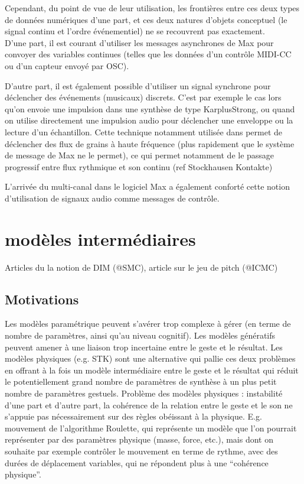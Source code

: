 Cependant, du point de vue de leur utilisation, les frontières entre ces deux types de données numériques d'une part, et ces deux natures d'objets conceptuel (le signal continu et l'ordre événementiel) ne se recouvrent pas exactement. \\
D'une part, il est courant d'utiliser les messages asynchrones de Max pour convoyer des variables continues (telles que les données d'un contrôle MIDI-CC ou d'un capteur envoyé par \gls{OSC}).\\


D'autre part, il est également possible d'utiliser un signal synchrone pour déclencher des événements (musicaux) discrets. C'est par exemple le cas lors qu'on envoie une impulsion dans une synthèse de type \gls{KarplusStrong}, ou quand on utilise directement une impulsion audio pour déclencher une enveloppe ou la lecture d'un échantillon.
Cette technique notamment utilisée dans \cite{bascou_gmu_2005} permet de déclencher des flux de grains à haute fréquence (plus rapidement que le système de message de Max ne le permet), ce qui permet notamment de le passage progressif entre flux rythmique et son continu (ref Stockhausen Kontakte)


L'arrivée du multi-canal dans le logiciel Max a également conforté cette notion d'utilisation de signaux audio comme messages de contrôle.


\section{modèles intermédiaires}
\label{sec:algorithms:MID}
Articles du la notion de DIM (@SMC), article sur le jeu de pitch (@ICMC)

\subsection{Motivations}
Les modèles paramétrique peuvent s'avérer trop complexe à gérer (en terme de nombre de paramètres, ainsi qu'au niveau cognitif). Les modèles génératifs peuvent amener à une liaison trop incertaine entre le geste et le résultat. Les modèles physiques (e.g. \gls{STK}) sont une alternative qui pallie ces deux problèmes en offrant à la fois un modèle intermédiaire entre le geste et le résultat qui réduit le potentiellement grand nombre de paramètres de synthèse à un plus petit nombre de paramètres gestuels. 
Problème des modèles physiques : instabilité d'une part et d'autre part, la cohérence de la relation entre le geste et le son ne s'appuie pas nécessairement sur des règles obéissant à la physique. 
E.g. mouvement de l'algorithme Roulette, qui représente un modèle que l'on pourrait représenter par des paramètres physique (masse, force, etc.), mais dont on souhaite par exemple contrôler le mouvement en terme de rythme, avec des durées de déplacement variables, qui ne répondent plus à une ``cohérence physique''.

